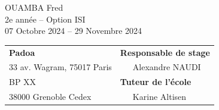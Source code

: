 \begin{center}
OUAMBA Fred\\
2e année -- Option ISI\\
\vspace{3mm}
07 Octobre 2024 -- 29 Novembre 2024\\
\vspace{6cm}
\begin{tabular}{p{10cm}p{10cm}}
{\bf Padoa}                                            &{\bf Responsable de stage}\\
{\footnotesize 33 av. Wagram, 75017 Paris}       & ~~~Alexandre NAUDI\\
{\footnotesize BP XX}                                        & {\bf Tuteur de l'école}\\
{\footnotesize 38000 Grenoble Cedex}                          & ~~~Karine Altisen\\
\end{tabular}
\end{center}


